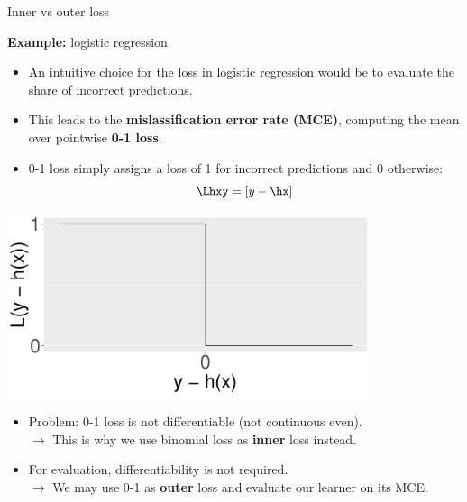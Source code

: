 \documentclass[11pt,compress,t,notes=noshow, xcolor=table]{beamer}
\begin{document}
\begin{vbframe}{Inner vs outer loss}

\small

\textbf{Example:} logistic regression

\begin{itemize}
  \item An intuitive choice for the loss in logistic regression would be to
  evaluate the share of incorrect predictions.
  \item This leads to the \textbf{mislassification error rate (MCE)}, computing
  the mean over pointwise \textbf{0-1 loss}.
\end{itemize}

\lz

\begin{minipage}{0.6\textwidth}
  \begin{itemize}
    \item 0-1 loss simply assigns a loss of 1 for incorrect predictions and 0
    otherwise: $$\Lhxy = [y - \hx]$$
  \end{itemize}
\end{minipage}%
\begin{minipage}{0.4\textwidth}
  \includegraphics[width=0.8\textwidth]{figure/zero-one-loss}
\end{minipage}

\lz

\begin{itemize}
  \item Problem: 0-1 loss is not differentiable (not continuous even). \\
  $\rightarrow$ This is why we use binomial loss as \textbf{inner} loss 
  instead.
  \item For evaluation, differentiability is not required. \\
  $\rightarrow$ We may use 0-1 as \textbf{outer} loss and evaluate our 
  learner on its MCE. 
\end{itemize}

\normalsize

\end{vbframe}
\end{document}
